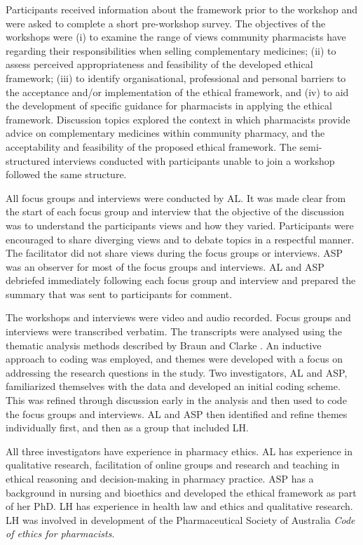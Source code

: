 \documentclass[11pt,a4paper]{article}
\begin{document}
Participants received information about the framework prior to the
workshop and were asked to complete a short pre-workshop survey. The
objectives of the workshops were (i) to examine the range of views
community pharmacists have regarding their responsibilities when selling
complementary medicines; (ii) to assess perceived appropriateness and
feasibility of the developed ethical framework; (iii) to identify
organisational, professional and personal barriers to the acceptance
and/or implementation of the ethical framework, and (iv) to aid the
development of specific guidance for pharmacists in applying the ethical
framework. Discussion topics explored the context in which pharmacists
provide advice on complementary medicines within community pharmacy, and
the acceptability and feasibility of the proposed ethical framework. The
semi-structured interviews conducted with participants unable to join a
workshop followed the same structure.

All focus groups and interviews were conducted by AL. It was made clear
from the start of each focus group and interview that the objective of
the discussion was to understand the participants views and how they
varied. Participants were encouraged to share diverging views and to
debate topics in a respectful manner. The facilitator did not share
views during the focus groups or interviews. ASP was an observer for
most of the focus groups and interviews. AL and ASP debriefed
immediately following each focus group and interview and prepared the
summary that was sent to participants for comment.

The workshops and interviews were video and audio recorded. Focus groups
and interviews were transcribed verbatim. The transcripts were analysed
using the thematic analysis methods described by Braun and Clarke
\autocite*{Braun2016}. An inductive approach to coding was employed, and
themes were developed with a focus on addressing the research questions
in the study. Two investigators, AL and ASP, familiarized themselves
with the data and developed an initial coding scheme. This was refined
through discussion early in the analysis and then used to code the focus
groups and interviews. AL and ASP then identified and refine themes
individually first, and then as a group that included LH.

All three investigators have experience in pharmacy ethics. AL has
experience in qualitative research, facilitation of online groups and
research and teaching in ethical reasoning and decision-making in
pharmacy practice. ASP has a background in nursing and bioethics and
developed the ethical framework as part of her PhD. LH has experience in
health law and ethics and qualitative research. LH was involved in
development of the Pharmaceutical Society of Australia \emph{Code of
ethics for pharmacists}.
\end{document}
